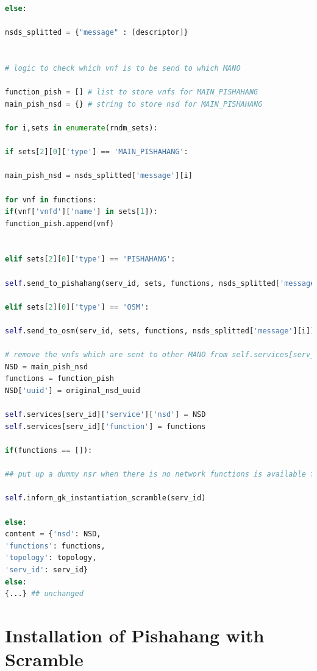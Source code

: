 \begin{lstlisting}[language=Python,caption=Extended \textbf{SLM\_mapping\_scramble} function, label=lis:SLM_scramble]
else:

nsds_splitted = {"message" : [descriptor]}


# logic to check which vnf is to be send to which MANO

function_pish = [] # list to store vnfs for MAIN_PISHAHANG
main_pish_nsd = {} # string to store nsd for MAIN_PISHAHANG

for i,sets in enumerate(rndm_sets):

if sets[2][0]['type'] == 'MAIN_PISHAHANG':

main_pish_nsd = nsds_splitted['message'][i]

for vnf in functions:
if(vnf['vnfd']['name'] in sets[1]):
function_pish.append(vnf)


elif sets[2][0]['type'] == 'PISHAHANG':

self.send_to_pishahang(serv_id, sets, functions, nsds_splitted['message'][i])

elif sets[2][0]['type'] == 'OSM':

self.send_to_osm(serv_id, sets, functions, nsds_splitted['message'][i])             

# remove the vnfs which are sent to other MANO from self.services[serv_id]['function']
NSD = main_pish_nsd
functions = function_pish
NSD['uuid'] = original_nsd_uuid

self.services[serv_id]['service']['nsd'] = NSD
self.services[serv_id]['function'] = functions

if(functions == []):

## put up a dummy nsr when there is no network functions is available for this mano. So as to keep the unique UUID of this instantiation request in ledger instead of forced rollback.

self.inform_gk_instantiation_scramble(serv_id)

else:
content = {'nsd': NSD,
'functions': functions,
'topology': topology,
'serv_id': serv_id} 
else:
{...} ## unchanged
\end{lstlisting}



\section{Installation of Pishahang with Scramble}

